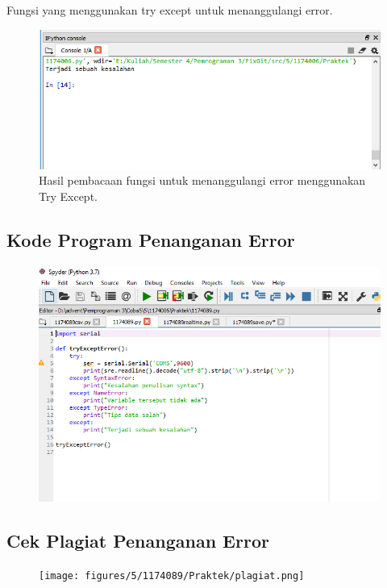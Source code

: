 \hfill \break
Fungsi yang menggunakan try except untuk menanggulangi error.



\begin{figure}[H]
	\includegraphics[width=12cm]{figures/5/1174089/Praktek/5.png}
	\centering
	\caption{Hasil pembacaan fungsi untuk menanggulangi error menggunakan Try Except.}
\end{figure}

\subsection{Kode Program Penanganan Error}
\begin{figure}[H]
	\includegraphics[width=12cm]{figures/5/1174089/Praktek/error.png}
	\centering
\end{figure}

\subsection{Cek Plagiat Penanganan Error}
\begin{figure}[H]
	\texttt{[image: figures/5/1174089/Praktek/plagiat.png]}
	\centering
\end{figure}
